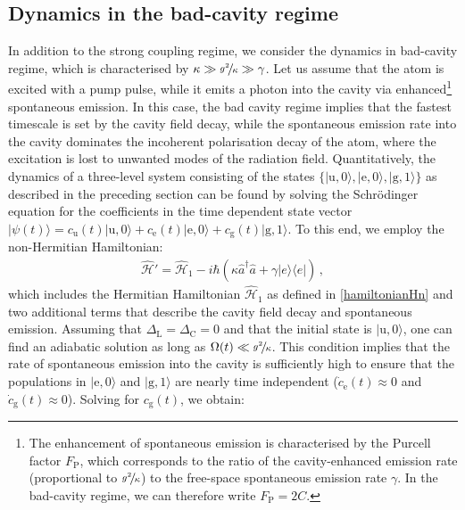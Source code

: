 \documentclass[../Thesis-IJspeert.tex]{subfiles}
\begin{document}
\subsection{Dynamics in the bad-cavity regime}
\label{badcavityregimesection}
In addition to the strong coupling regime, we consider the dynamics in bad-cavity regime, which is characterised by $\kappa \gg \sfrac{g^2\!}{\kappa} \gg \gamma $. Let us assume that the atom is excited with a pump pulse, while it emits a photon into the cavity via enhanced\footnote{The enhancement of spontaneous emission is characterised by the Purcell factor $F_\mathrm{P}$, which corresponds to the ratio of the cavity-enhanced emission rate (proportional to $\sfrac{g^2\!}{\kappa}$) to the free-space spontaneous emission rate $\gamma$. In the bad-cavity regime, we can therefore write $F_\mathrm{P}=2C$.} spontaneous emission. In this case, the bad cavity regime implies that the fastest timescale is set by the cavity field decay, while the spontaneous emission rate into the cavity dominates the incoherent polarisation decay of the atom, where the excitation is lost to unwanted modes of the radiation field. Quantitatively, the dynamics of a three-level system consisting of the states $\{ \vert \mathrm{u}, 0 \rangle, \vert \mathrm{e}, 0 \rangle, \vert \mathrm{g}, 1 \rangle \}$ as described in the preceding section can be found by solving the Schr\"{o}dinger equation for the coefficients in the time dependent state vector $\vert \psi (t) \rangle = c_\mathrm{u}(t)\vert \mathrm{u},0\rangle+c_\mathrm{e}(t)\vert \mathrm{e}, 0 \rangle + c_\mathrm{g}(t) \vert \mathrm{g},1\rangle$. To this end, we employ the non-Hermitian Hamiltonian:
\begin{align}
	\hat{\mathcal{H}}' = \hat{\mathcal{H}}_1 - i \hbar (\kappa \hat{a}^\dagger\hat{a}+\gamma \vert e \rangle\langle e \vert)\,,
\end{align}
which includes the Hermitian Hamiltonian $\hat{\mathcal{H}}_1$ as defined in \autoref{hamiltonianHn} and two additional terms that describe the cavity field decay and spontaneous emission. Assuming that $\Delta_\mathrm{L}=\Delta_\mathrm{C}=0$ and that the initial state is $\vert \mathrm{u}, 0\rangle$, one can find an adiabatic solution as long as $\Omega(t)\ll \sfrac{g^2\!}{\kappa}$. This condition implies that the rate of spontaneous emission into the cavity is sufficiently high to ensure that the populations in $\vert \mathrm{e},0\rangle$ and $\vert \mathrm{g}, 1 \rangle$ are nearly time independent ($\dot{c}_\mathrm{e}(t)\approx 0 $ and $\dot{c}_\mathrm{g}(t)\approx 0$). Solving for $c_\mathrm{g}(t)$, we obtain:
\end{document}
